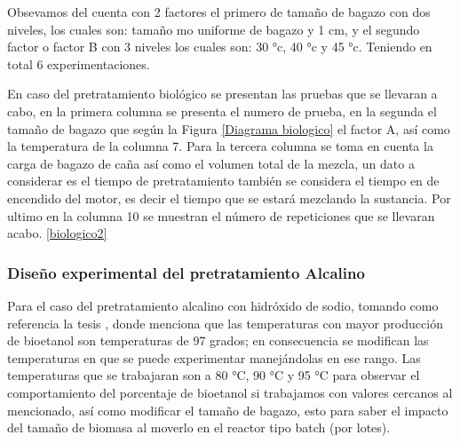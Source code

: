 \documentclass[12pt]{article}
\begin{document}
		
		Obsevamos del cuenta con 2 factores el primero de tamaño de bagazo con dos niveles, los cuales son: tamaño mo uniforme de bagazo y 1 cm, y el segundo factor o factor B con 3 niveles los cuales son: 30 °c, 40 °c y 45 °c.
		Teniendo en total 6 experimentaciones.
		
		
		
		
		En caso del pretratamiento biológico se presentan las pruebas que se llevaran a cabo, en la primera columna se presenta el numero de prueba, en la segunda el tamaño de bagazo que según la Figura \ref{Diagrama biologico} el factor A, así como la temperatura de la columna 7. Para la tercera columna se toma en cuenta la carga de bagazo de caña así como el volumen total de la mezcla, un dato a considerar es el tiempo de pretratamiento también se considera el tiempo en de encendido del motor, es decir el tiempo que se estará mezclando la sustancia. Por ultimo en la columna 10 se muestran el número de repeticiones que se llevaran acabo.   \ref{biologico2}
		
		
		
		
		
		
		
		
		
		
		
		
		
	
		
	\subsubsection{ Diseño experimental del pretratamiento Alcalino}
	\label{Diseño factorial del pretratamiento alcalino}

Para el caso del pretratamiento alcalino con hidróxido de sodio, tomando como referencia la tesis \cite{Arturo2022evaluacion}, donde menciona que las temperaturas con mayor producción de bioetanol son temperaturas de 97 grados; en consecuencia se modifican las temperaturas en que se puede experimentar manejándolas en ese rango.
Las temperaturas que se trabajaran son a 80 °C, 90 °C y 95 °C para observar el comportamiento del porcentaje de bioetanol si trabajamos con valores cercanos al mencionado, así como modificar el tamaño de bagazo, esto para saber el impacto del tamaño de biomasa al moverlo en el reactor tipo batch (por lotes).
\end{document}
